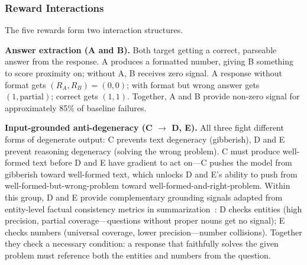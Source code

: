 \subsubsection{Reward Interactions}
\nestindent

The five rewards form two interaction structures.

\textbf{Answer extraction (A and B).}
Both target getting a correct, parseable answer from the response.
A produces a formatted number, giving B something to score proximity on; without A, B receives zero signal.
A response without format gets $(R_A, R_B) = (0, 0)$; with format but wrong answer gets $(1, \text{partial})$; correct gets $(1, 1)$.
Together, A and B provide non-zero signal for approximately 85\% of baseline failures.

\textbf{Input-grounded anti-degeneracy (C $\to$ D, E).}
All three fight different forms of degenerate output: C prevents text degeneracy (gibberish), D and E prevent reasoning degeneracy (solving the wrong problem).
C must produce well-formed text before D and E have gradient to act on---C pushes the model from gibberish toward well-formed text, which unlocks D and E's ability to push from well-formed-but-wrong-problem toward well-formed-and-right-problem.
Within this group, D and E provide complementary grounding signals adapted from entity-level factual consistency metrics in summarization~\cite{nan2021entity}: D checks entities (high precision, partial coverage---questions without proper nouns get no signal); E checks numbers (universal coverage, lower precision---number collisions).
Together they check a necessary condition: a response that faithfully solves the given problem must reference both the entities and numbers from the question.
\nestunindent
